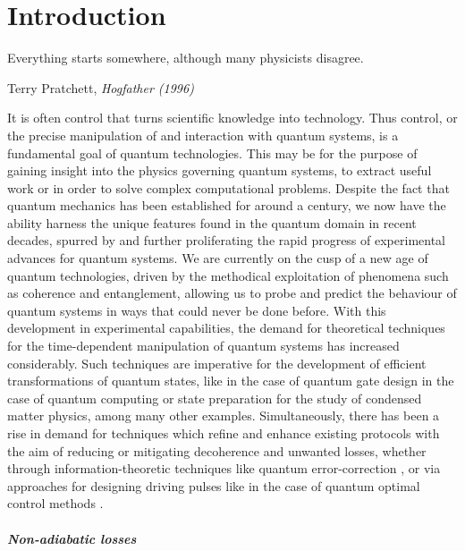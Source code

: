 \chapter{Introduction}

\epigraph{Everything starts somewhere, although many physicists disagree.}{Terry Pratchett, \emph{Hogfather (1996)}}

It is often control that turns scientific knowledge into technology. Thus control, or the precise manipulation of and interaction with quantum systems, is a fundamental goal of quantum technologies. This may be for the purpose of gaining insight into the physics governing quantum systems, to extract useful work or in order to solve complex computational problems. Despite the fact that quantum mechanics has been established for around a century, we now have the ability harness the unique features found in the quantum domain in recent decades, spurred by and further proliferating the rapid progress of experimental advances for quantum systems. We are currently on the cusp of a new age of quantum technologies, driven by the methodical exploitation of phenomena such as coherence and entanglement, allowing us to probe and predict the behaviour of quantum systems in ways that could never be done before. With this development in experimental capabilities, the demand for theoretical techniques for the time-dependent manipulation of quantum systems has increased considerably. Such techniques are imperative for the development of efficient transformations of quantum states, like in the case of quantum gate design \cite{pelegri_high-fidelity_2022} in the case of quantum computing or state preparation \cite{dimitrova_many-body_2023} for the study of condensed matter physics, among many other examples. Simultaneously, there has been a rise in demand for techniques which refine and enhance existing protocols with the aim of reducing or mitigating decoherence and unwanted losses, whether through information-theoretic techniques like quantum error-correction \cite{roffe_quantum_2019}, or via approaches for designing driving pulses like in the case of quantum optimal control methods \cite{glaser_training_2015, koch_quantum_2022}. 

\paragraph*{Non-adiabatic losses}


